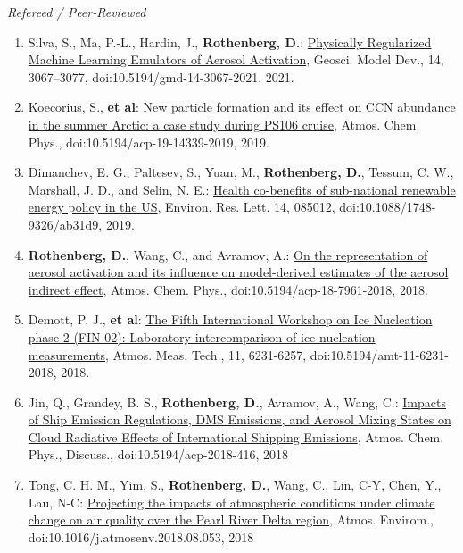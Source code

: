 \documentclass[11pt,letterpaper]{article}
\begin{document}
 \bigskip
 \emph{Refereed / Peer-Reviewed}
 \medskip
 \begin{enumerate}[itemindent=-10pt]

 \item Silva, S., Ma, P.-L., Hardin, J., \textbf{Rothenberg, D.}: \href{https://doi.org/10.5194/gmd-14-3067-2021}{Physically Regularized Machine Learning Emulators of Aerosol Activation}, Geosci. Model Dev., 14, 3067–3077, doi:10.5194/gmd-14-3067-2021, 2021.

 \item Koecorius, S., \textbf{et al}: \href{https://doi.org/10.5194/acp-19-14339-2019}{New particle formation and its effect on CCN abundance in the summer Arctic: a case study during PS106 cruise}, Atmos. Chem. Phys., doi:10.5194/acp-19-14339-2019, 2019.

 \item Dimanchev, E. G., Paltesev, S., Yuan, M., \textbf{Rothenberg, D.}, Tessum, C. W., Marshall, J. D., and Selin, N. E.: \href{https://doi.org/10.1088/1748-9326/ab31d9}{Health co-benefits of sub-national renewable energy policy in the US}, Environ. Res. Lett. 14, 085012, doi:10.1088/1748-9326/ab31d9, 2019.

 \item \textbf{Rothenberg, D.}, Wang, C., and Avramov, A.: \href{http://doi.org/10.5194/acp-18-7961-2018}{On the representation of aerosol activation and its influence on model-derived estimates of the aerosol indirect effect}, Atmos. Chem. Phys., doi:10.5194/acp-18-7961-2018, 2018.

 \item Demott, P. J., \textbf{et al}: \href{https://doi.org/10.5194/amt-11-6231-2018}{The Fifth International Workshop on Ice Nucleation phase 2 (FIN-02): Laboratory intercomparison of ice nucleation measurements}, Atmos. Meas. Tech., 11, 6231-6257, doi:10.5194/amt-11-6231-2018, 2018.

 \item Jin, Q., Grandey, B. S., \textbf{Rothenberg, D.}, Avramov, A., Wang, C.: \href{https://doi.org/10.5194/acp-2018-416}{Impacts of Ship Emission Regulations, DMS Emissions, and Aerosol Mixing States on Cloud Radiative Effects of International Shipping Emissions}, Atmos. Chem. Phys., Discuss., doi:10.5194/acp-2018-416, 2018

 \item Tong, C. H. M., Yim, S., \textbf{Rothenberg, D.}, Wang, C., Lin, C-Y, Chen, Y., Lau, N-C: \href{https://doi.org/10.1016/j.atmosenv.2018.08.053}{Projecting the impacts of atmospheric conditions under climate change on air quality over the Pearl River Delta region}, Atmos. Envirom., doi:10.1016/j.atmosenv.2018.08.053, 2018


\end{enumerate}
\end{document}

